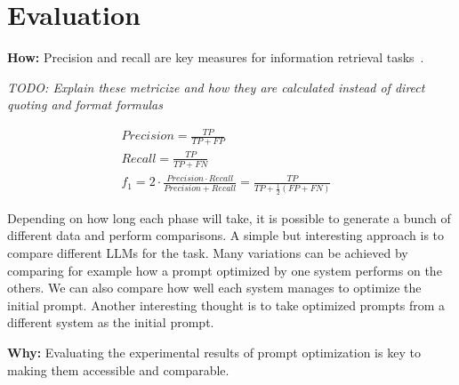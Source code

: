 \section{Evaluation}
\label{approach:sec:evaluation}
\textbf{How:} Precision and recall are key measures for information retrieval tasks~\cite{hayes2006AdvancingCandidate}.

\textit{TODO: Explain these metricize and how they are calculated instead of direct quoting and format formulas}

\begin{align*}
    Precision = \frac{TP}{TP + FP} &\\
    Recall = \frac{TP}{TP + FN} &\\
    f_1 = 2 \cdot \frac{Precision \cdot Recall}{Precision + Recall} = \frac{TP}{TP + \frac{1}{2}(FP + FN)} &
\end{align*}



Depending on how long each phase will take, it is possible to generate a bunch of different data and perform comparisons.
A simple but interesting approach is to compare different LLMs for the task.
Many variations can be achieved by comparing for example how a prompt optimized by one system performs on the others.
We can also compare how well each system manages to optimize the initial prompt.
Another interesting thought is to take optimized prompts from a different system as the initial prompt.


\textbf{Why:} Evaluating the experimental results of prompt optimization is key to making them accessible and comparable. 